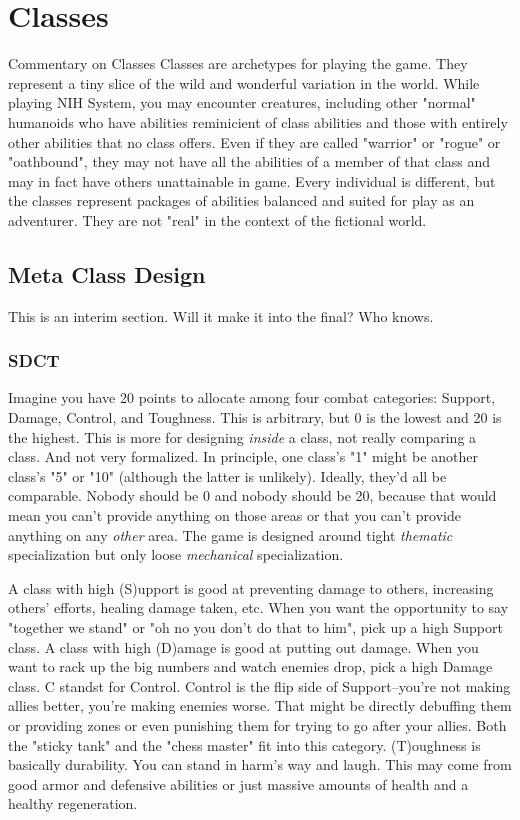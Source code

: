 \chapter{Classes}
\label{ch:classes}

\begin{DndComment}{Commentary on Classes}
Classes are archetypes for playing the game. They represent a tiny slice of the wild and wonderful variation in the world. While playing NIH System, you may encounter creatures, including other "normal" humanoids who have abilities reminicient of class abilities and those with entirely other abilities that no class offers. Even if they are called "warrior" or "rogue" or "oathbound", they may not have all the abilities of a member of that class and may in fact have others unattainable in game. Every individual is different, but the classes represent packages of abilities balanced and suited for play as an adventurer. They are not "real" in the context of the fictional world.
\end{DndComment}

\section{Meta Class Design}
This is an interim section. Will it make it into the final? Who knows.

\subsection{SDCT}
Imagine you have 20 points to allocate among four combat categories: Support, Damage, Control, and Toughness. This is arbitrary, but 0 is the lowest and 20 is the highest. This is more for designing \textit{inside} a class, not really comparing a class. And not very formalized. In principle, one class's "1" might be another class's "5" or "10" (although the latter is unlikely). Ideally, they'd all be comparable. Nobody should be 0 and nobody should be 20, because that would mean you can't provide anything on those areas or that you can't provide anything on any \textit{other} area. The game is designed around tight \textit{thematic} specialization but only loose \textit{mechanical} specialization. 

A class with high (S)upport is good at preventing damage to others, increasing others' efforts, healing damage taken, etc. When you want the opportunity to say "together we stand" or "oh no you don't do that to him", pick up a high Support class. A class with high (D)amage is good at putting out damage. When you want to rack up the big numbers and watch enemies drop, pick a high Damage class. C standst for Control. Control is the flip side of Support--you're not making allies better, you're making enemies worse. That might be directly debuffing them or providing zones or even punishing them for trying to go after your allies. Both the "sticky tank" and the "chess master" fit into this category. (T)oughness is basically durability. You can stand in harm's way and laugh. This may come from good armor and defensive abilities or just massive amounts of health and a healthy regeneration.

